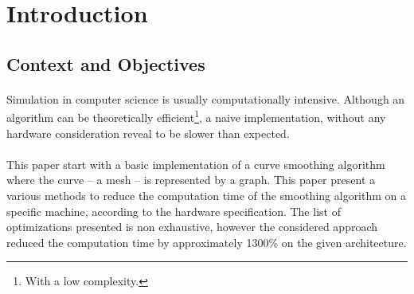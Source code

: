 \documentclass[fleqn,11pt]{SelfArx} %
\affiliation{\textsuperscript{1}RB812 \hfill \textsuperscript{2}AC5612 \hfill \textsuperscript{3}GF210}
\begin{document}



\flushbottom %

\maketitle %

\tableofcontents %

\thispagestyle{empty} %


\section{Introduction}
\subsection{Context and Objectives}
\paragraph{}
Simulation in computer science is usually computationally intensive. Although an algorithm can be theoretically efficient\footnote{With a low complexity.}, a naive implementation, without any hardware consideration reveal to be slower than expected.
\paragraph{}
This paper start with a basic implementation of a curve smoothing algorithm where the curve -- a mesh -- is represented by a graph. This paper present a various methods to reduce the computation time of the smoothing algorithm on a specific machine, according to the hardware specification. The list of optimizations presented is non exhaustive, however the considered approach reduced the computation time by approximately 1300\% on the given architecture.
\end{document}
